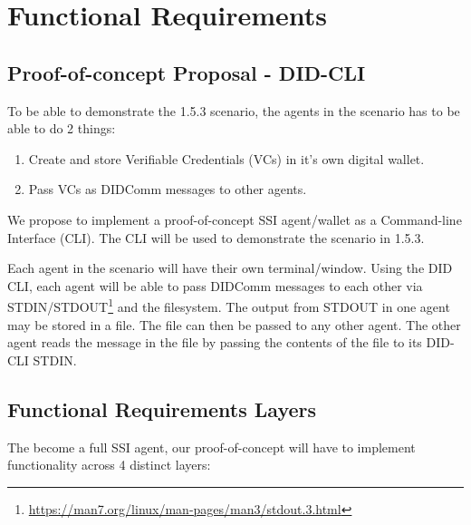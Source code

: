 \hypertarget{functional-requirements}{%
\chapter{Functional Requirements}\label{functional-requirements}}



\hypertarget{proof-of-concept---did-cli}{%
\section{Proof-of-concept Proposal - DID-CLI}\label{proof-of-concept---did-cli}}

To be able to demonstrate the 1.5.3 scenario, the agents in the scenario
has to be able to do 2 things:

\begin{enumerate}
\def\labelenumi{\arabic{enumi}.}
\tightlist
\item
  Create and store Verifiable Credentials (VCs) in it's own digital
  wallet.
\item
  Pass VCs as DIDComm messages to other agents.
\end{enumerate}

We propose to implement a proof-of-concept SSI agent/wallet as a
Command-line Interface (CLI). The CLI will be used to demonstrate the
scenario in 1.5.3.

Each agent in the scenario will have their own terminal/window. Using
the DID CLI, each agent will be able to pass DIDComm messages to each
other via STDIN/STDOUT\footnote{\url{https://man7.org/linux/man-pages/man3/stdout.3.html}} and the filesystem. The output from STDOUT in one agent may be
stored in a file. The file can then be passed to any other agent. The
other agent reads the message in the file by passing the contents of the
file to its DID-CLI STDIN.

\pagebreak

\hypertarget{functional-requirements-layers}{%
\section{Functional Requirements
Layers}\label{functional-requirements-layers}}

The become a full SSI agent, our proof-of-concept will have to implement
functionality across 4 distinct layers:

